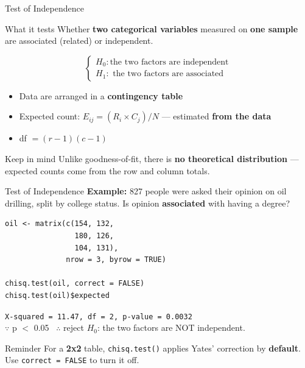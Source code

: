 \documentclass{beamer}					%
\begin{document}
\begin{frame}{Test of Independence}
\small
\begin{block}{What it tests}
Whether \textbf{two categorical variables} measured on \textbf{one sample}
are associated (related) or independent.
\end{block}

\vspace{0.5em}
$$
\begin{cases}
H_0: \text{the two factors are independent} \\
H_1: \text{ the two factors are associated}
\end{cases}
$$
\begin{itemize}
    \item Data are arranged in a \textbf{contingency table}
    \item Expected count: $E_{ij} = (R_i \times C_j) / N$ --- estimated \textbf{from the data}
    \item df $= (r-1)(c-1)$
\end{itemize}

\vspace{0.8em}
\begin{alertblock}{Keep in mind}
Unlike goodness-of-fit, there is \textbf{no theoretical distribution} ---
expected counts come from the row and column totals.
\end{alertblock}

\end{frame}


\begin{frame}[fragile]{Test of Independence}
\small
\textbf{Example:} 827 people were asked their opinion on oil drilling,
split by college status. Is opinion \textbf{associated} with having a degree?

\begin{lstlisting}
oil <- matrix(c(154, 132,
                180, 126,
                104, 131),
              nrow = 3, byrow = TRUE)

chisq.test(oil, correct = FALSE) 
chisq.test(oil)$expected 
\end{lstlisting}

\vspace{0.3em}
\texttt{X-squared = 11.47, df = 2, p-value = 0.0032}\\
\vspace{0.3em}
$\because$ p $<$ 0.05 \ $\therefore$ reject $H_0$: the two factors are NOT independent.

\vspace{0.6em}
\begin{alertblock}{Reminder}
For a \textbf{2x2} table, \texttt{chisq.test()} applies Yates' correction by
\textbf{default}. Use \texttt{correct = FALSE} to turn it off.
\end{alertblock}
\end{frame}
\end{document}
